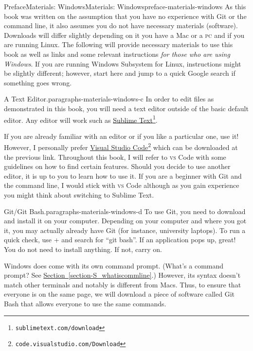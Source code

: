 \documentclass[oneside,10pt,]{book}
\newcommand{\xreffont}{\relax}
\newcommand{\initialism}[1]{\textsc{\MakeLowercase{#1}}}
\newcommand{\kbd}[1]{\keys{{#1}}}
\begin{document}
\begin{preface}{Preface}{Materials: Windows}{}{Materials: Windows}{}{}{preface-materials-windows}
As this book was written on the assumption that you have no experience with Git or the command line, it also assumes you do not have necessary materials (software). Downloads will differ slightly depending on it you have a Mac or a \initialism{PC} and if you are running Linux. The following will provide necessary materials to use this book as well as links and some relevant instructions \emph{for those who are using Windows}. If you are running Windows Subsystem for Linux, instructions might be slightly different; however, start here and jump to a quick Google search if something goes wrong.%
\begin{paragraphs}{A Text Editor.}{paragraphs-materials-windows-c}%
In order to edit files as demonstrated in this book, you will need a text editor outside of the basic default editor. Any editor will work such as \href{https://www.sublimetext.com/download}{Sublime Text}\footnote{\nolinkurl{sublimetext.com/download}\label{fn-materials-windows-c-b-b}}.%
\par
If you are already familiar with an editor or if you like a particular one, use it! However, I personally prefer \href{https:/code.visualstudio.com/Download}{Visual Studio Code}\footnote{\nolinkurl{code.visualstudio.com/Download}\label{fn-materials-windows-c-c-b}} which can be downloaded at the previous link. Throughout this book, I will refer to \initialism{VS} Code with some guidelines on how to find certain features. Should you decide to use another editor, it is up to you to learn how to use it. If you are a beginner with Git and the command line, I would stick with \initialism{VS} Code although as you gain experience you might think about switching to Sublime Text.%
\end{paragraphs}%
\begin{paragraphs}{Git\slash{}Git Bash.}{paragraphs-materials-windows-d}%
To use Git, you need to download and install it on your computer. Depending on your computer and where you got it, you may actually already have Git (for instance, university laptops). To run a quick check, use \kbd{Windows} + \kbd{S} and search for ``git bash''. If an application pops up, great! You do not need to install anything. If not, carry on.%
\par
Windows does come with its own command prompt. (What's a command prompt? See \hyperref[section-S_whatiscommline]{Section~{\xreffont\ref{section-S_whatiscommline}}}.) However, its syntax doesn't match other terminals and notably is different from Macs. Thus, to ensure that everyone is on the same page, we will download a piece of software called Git Bash that allows everyone to use the same commands.%

\end{paragraphs}
\end{preface}
\end{document}

